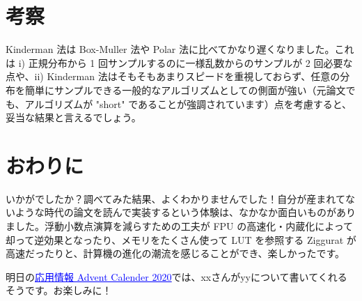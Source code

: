 \documentclass[twocolumn, dvipdfmx]{jsarticle}
\begin{document}
\section*{考察}

Kinderman 法は Box-Muller 法や Polar 法に比べてかなり遅くなりました。これは i) 正規分布から 1 回サンプルするのに一様乱数からのサンプルが 2 回必要な点や、ii) Kinderman 法はそもそもあまりスピードを重視しておらず、任意の分布を簡単にサンプルできる一般的なアルゴリズムとしての側面が強い（元論文でも、アルゴリズムが "short" であることが強調されています）点を考慮すると、妥当な結果と言えるでしょう。

\section*{おわりに}

いかがでしたか？調べてみた結果、よくわかりませんでした！自分が産まれてないような時代の論文を読んで実装するという体験は、なかなか面白いものがありました。浮動小数点演算を減らすための工夫が FPU の高速化・内蔵化によって却って逆効果となったり、メモリをたくさん使って LUT を参照する Ziggurat が高速だったりと、計算機の進化の潮流を感じることができ、楽しかったです。

明日の\href{https://adventar.org/calendars/5671}{\textcolor{blue}{\underline{応用情報 Advent Calender 2020}}}では、xxさんがyyについて書いてくれるそうです。お楽しみに！



\end{document}
